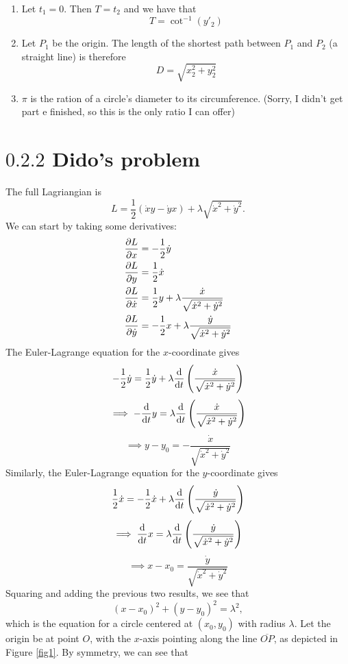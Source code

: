 \documentclass[12pt]{article}
\begin{document}
\begin{enumerate}[label=(\alph*)]
    \item Let $t_1 = 0$. Then $T = t_2$ and we have that
    \[ T = \cot^{-1}(y'_2) \]
    
    \item Let $P_1$ be the origin. The length of the shortest path between $P_1$ and $P_2$ (a straight line) is therefore
    \[ D = \sqrt{x_2^2 + y_2^2} \]

    \item $\pi$ is the ration of a circle's diameter to its circumference. (Sorry, I didn't get part e finished, so this is the only ratio I can offer)
\end{enumerate}


\section*{$0.2.2$ Dido's problem}
The full Lagriangian is
\[ L = \frac{1}{2}(\dot{x}y - \dot{y}x) + \lambda\sqrt{\dot{x}^2 + \dot{y}^2}. \]
We can start by taking some derivatives:
\begin{align*}
    \pdv{L}{x} &= -\frac{1}{2}\dot{y} \\
    \pdv{L}{y} &= \frac{1}{2}\dot{x} \\
    \pdv{L}{\dot{x}} &= \frac{1}{2}y + \lambda\frac{\dot{x}}{\sqrt{\dot{x}^2 + \dot{y}^2}} \\
    \pdv{L}{\dot{y}} &= -\frac{1}{2}x + \lambda\frac{\dot{y}}{\sqrt{\dot{x}^2 + \dot{y}^2}}
\end{align*}
The Euler-Lagrange equation for the $x$-coordinate gives
\[ -\frac{1}{2}\dot{y} = \frac{1}{2}\dot{y} + \lambda \dv{t}\left(\frac{\dot{x}}{\sqrt{\dot{x}^2 + \dot{y}^2}}\right) \]
\[ \implies -\dv{t}y = \lambda \dv{t}\left(\frac{\dot{x}}{\sqrt{\dot{x}^2 + \dot{y}^2}}\right) \] 
\[ \implies y - y_0 = -\frac{\dot{x}}{\sqrt{\dot{x}^2 + \dot{y}^2}} \]
Similarly, the Euler-Lagrange equation for the $y$-coordinate gives
\[ \frac{1}{2}\dot{x} = -\frac{1}{2}\dot{x} + \lambda \dv{t}\left(\frac{\dot{y}}{\sqrt{\dot{x}^2 + \dot{y}^2}}\right) \]
\[ \implies \dv{t}x = \lambda \dv{t}\left(\frac{\dot{y}}{\sqrt{\dot{x}^2 + \dot{y}^2}}\right) \] 
\[ \implies x - x_0 = \frac{\dot{y}}{\sqrt{\dot{x}^2 + \dot{y}^2}} \]
Squaring and adding the previous two results, we see that
\[ (x-x_0)^2 + (y-y_0)^2 = \lambda^2, \]
which is the equation for a circle centered at $(x_0, y_0)$ with radius $\lambda$. Let the origin be at point $O$, with the $x$-axis pointing along the line $\overline{OP}$, as depicted in Figure \ref{fig1}. By symmetry, we can see that 
\end{document}

